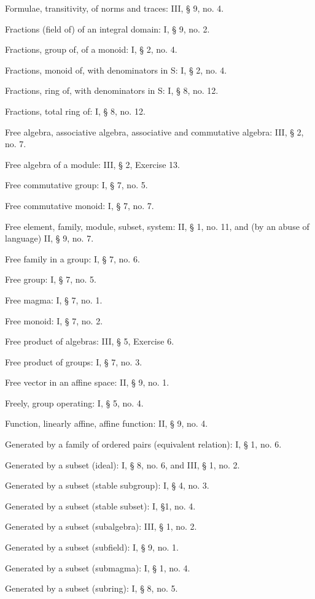 Formulae, transitivity, of norms and traces: III, § 9, no. 4.

Fractions (field of) of an integral domain: I, § 9, no. 2.

Fractions, group of, of a monoid: I, § 2, no. 4.

Fractions, monoid of, with denominators in S: I, § 2, no. 4.

Fractions, ring of, with denominators in S: I, § 8, no. 12.

Fractions, total ring of: I, § 8, no. 12.

Free algebra, associative algebra, associative and commutative algebra: III, § 2, no. 7.

Free algebra of a module: III, § 2, Exercise 13.

Free commutative group: I, § 7, no. 5.

Free commutative monoid: I, § 7, no. 7.

Free element, family, module, subset, system: II, § 1, no. 11, and (by an abuse of language) II, § 9, no. 7.

Free family in a group: I, § 7, no. 6.

Free group: I, § 7, no. 5.

Free magma: I, § 7, no. 1.

Free monoid: I, § 7, no. 2.

Free product of algebras: III, § 5, Exercise 6.

Free product of groups: I, § 7, no. 3.

Free vector in an affine space: II, § 9, no. 1.

Freely, group operating: I, § 5, no. 4.

Function, linearly affine, affine function: II, § 9, no. 4.

Generated by a family of ordered pairs (equivalent relation): I, § 1, no. 6.

Generated by a subset (ideal): I, § 8, no. 6, and III, § 1, no. 2.

Generated by a subset (stable subgroup): I, § 4, no. 3.

Generated by a subset (stable subset): I, §1, no. 4.

Generated by a subset (subalgebra): III, § 1, no. 2.

Generated by a subset (subfield): I, § 9, no. 1.

Generated by a subset (submagma): I, § 1, no. 4.

Generated by a subset (subring): I, § 8, no. 5.

